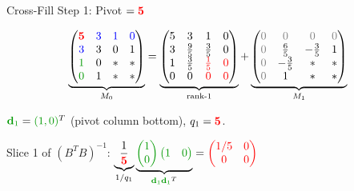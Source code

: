 \documentclass[10pt]{beamer}
\theoremstyle{definition}
\newcommand{\pvt}[1]{{\color{red}\mathbf{#1}}}       %
\newcommand{\crs}[1]{{\color{blue}#1}}                %
\newcommand{\gn}[1]{{\color{green!60!black}#1}}       %
\newcommand{\rd}[1]{{\color{red}#1}}                  %
\newcommand{\gz}{{\color{gray}0}}                      %
\begin{document}
\begin{frame}{Cross-Fill Step 1: Pivot $= \pvt{5}$}

$$\underbrace{\begin{pmatrix} \pvt{5} & \crs{3} & \crs{1} & \crs{0} \\ \crs{3} & 3 & 0 & 1 \\ \gn{1} & 0 & * & * \\ \gn{0} & 1 & * & * \end{pmatrix}}_{M_0}
= \underbrace{\begin{pmatrix} 5 & 3 & 1 & 0 \\ 3 & \tfrac{9}{5} & \tfrac{3}{5} & 0 \\ 1 & \tfrac{3}{5} & \rd{\tfrac{1}{5}} & \rd{0} \\ 0 & 0 & \rd{0} & \rd{0} \end{pmatrix}}_{\text{rank-1}}
+ \underbrace{\begin{pmatrix} \gz & \gz & \gz & \gz \\ \gz & \tfrac{6}{5} & {-}\tfrac{3}{5} & 1 \\ \gz & {-}\tfrac{3}{5} & * & * \\ \gz & 1 & * & * \end{pmatrix}}_{M_1}$$

\vspace{0.3em}

$\gn{\mathbf{d}_1} = \gn{(1, 0)}^T$ (pivot column bottom), \; $q_1 = \pvt{5}$.

\vspace{0.2em}

Slice 1 of $(B^TB)^{-1}$: \; $\underbrace{\dfrac{1}{\pvt{5}}}_{1/q_1}\underbrace{\gn{\begin{pmatrix}1\\0\end{pmatrix}\begin{pmatrix}1&0\end{pmatrix}}}_{\gn{\mathbf{d}_1}\gn{\mathbf{d}_1}^T} = \rd{\begin{pmatrix} 1/5 & 0 \\ 0 & 0 \end{pmatrix}}$

\end{frame}
\end{document}
